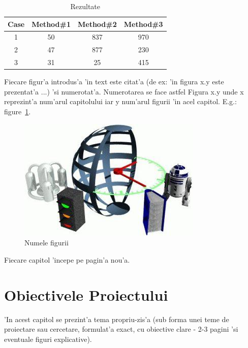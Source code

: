 \documentclass[12pt,a4paper,twoside]{report}
\begin{document}
\begin{table}[ht]
\caption{Rezultate}
\centering                          %
\begin{tabular}{|c|c|c|c|}          %
\hline\hline                        %
Case & Method\#1 & Method\#2 & Method\#3 \\ [0.5ex]   %
\hline                              %
1 & 50 & 837 & 970 \\               %
2 & 47 & 877 & 230 \\
3 & 31 & 25 & 415 \\[1ex]           %
\hline                              
\end{tabular}
\label{table:nonlin}                %
\end{table}

Fiecare figur'a introdus'a 'in text este citat'a (de ex: 'in figura x.y este prezentat'a ...) 'si numerotat'a. 
Numerotarea se face astfel Figura x.y unde x reprezint'a num'arul capitolului iar y num'arul figurii 'in acel capitol. 
E.g.: figure~\ref{fig:imag}.

\begin{figure}[ht]
    \centering
\includegraphics[]{img/test.jpg}
    \caption{Numele figurii}
    \label{fig:imag}
\end{figure}

Fiecare capitol 'incepe pe pagin'a nou'a.

\chapter{Obiectivele Proiectului}

'In acest capitol se prezint'a tema propriu-zis'a (sub forma unei teme de proiectare sau cercetare, formulat'a exact, cu obiective clare - 2-3 pagini 'si eventuale figuri explicative).
\end{document}
